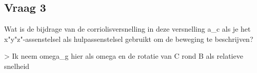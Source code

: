 \documentclass{article}
\begin{document}
\subsection{\textbf{Vraag 3}}
\begin{maplegroup}
\begin{Maple Normal}{
Wat is de bijdrage van de corriolisversnelling in deze versnelling a\_c als je het x"y"z"-assenstelsel als hulpassenstelsel gebruikt om de beweging te beschrijven?}\end{Maple Normal}

\begin{Maple Normal}{
}\end{Maple Normal}
\begin{Maple Normal}{
> Ik neem omega\_g hier als omega en de rotatie van C rond B als relatieve snelheid}\end{Maple Normal}
\end{maplegroup}
\begin{maplegroup}
\begin{mapleinput}
\end{mapleinput}
\mapleresult
{}
\end{maplegroup}
\begin{maplegroup}
\begin{mapleinput}
\end{mapleinput}
\mapleresult
{}
\end{maplegroup}
\end{document}
